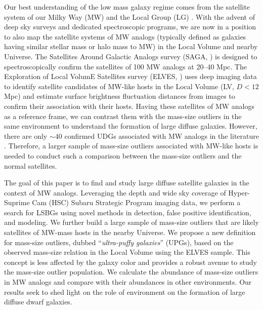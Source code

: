 \documentclass[twocolumn,astrosymb,twocolappendix]{aastex631}
\begin{document}
\begin{CJK*}{UTF8}{gbsn}
Our best understanding of the low mass galaxy regime comes from the satellite system of our Milky Way (MW) and the Local Group (LG) \citep[e.g.,][]{McConnachie2012,Simon2019}. With the advent of deep sky surveys and dedicated spectroscopic programs, we are now in a position to also map the satellite systems of MW analogs (typically defined as galaxies having similar stellar mass or halo mass to MW) in the Local Volume and nearby Universe. The Satellites Around Galactic Analogs survey (SAGA, \citealt{SAGA-I,SAGA-II}) is designed to spectroscopically confirm the satellites of 100 MW analogs at 20--40 Mpc. The Exploration of Local VolumE Satellites survey (ELVES,  \citealt{ELVES-I,ELVES-II,CarlstenELVES2022}) uses deep imaging data to identify satellite candidates of MW-like hosts in the Local Volume (LV, $D<12$ Mpc) and estimate surface brightness fluctuation distances from images to confirm their association with their hosts. Having these satellites of MW analogs as a reference frame, we can contrast them with the mass-size outliers in the same environment to understand the formation of large diffuse galaxies. However, there are only $\sim 40$ confirmed UDGs associated with MW analogs in the literature \citep{Roman2017b,Cohen2018,SAGA-II,CarlstenELVES2022,Nashimoto2022,Karunakaran2022b}. Therefore, a larger sample of mass-size outliers associated with MW-like hosts is needed to conduct such a comparison between the mass-size outliers and the normal satellites.

The goal of this paper is to find and study large diffuse satellite galaxies in the context of MW analogs. Leveraging the depth and wide sky coverage of Hyper-Suprime Cam (HSC) Subaru Strategic Program imaging data, we perform a search for LSBGs using novel methods in detection, false positive identification, and modeling. We further build a large sample of mass-size outliers that are likely satellites of MW-mass hosts in the nearby Universe. We propose a new definition for mass-size outliers, dubbed ``\textit{ultra-puffy galaxies}'' (UPGs), based on the observed mass-size relation in the Local Volume using the ELVES sample. This concept is less affected by the galaxy color and provides a robust avenue to study the mass-size outlier population. 
We calculate the abundance of mass-size outliers in MW analogs and compare with their abundances in other environments. Our results seek to shed light on the role of environment on the formation of large diffuse dwarf galaxies. 


\end{CJK*}
\end{document}
